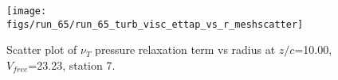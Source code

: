 \begin{figure}[H]
\centering
\texttt{[image: figs/run\_65/run\_65\_turb\_visc\_ettap\_vs\_r\_meshscatter]}
\caption{Scatter plot of $\nu_T$ pressure relaxation term vs radius at $z/c$=10.00, $V_{free}$=23.23, station 7.}
\label{fig:run_65_turb_visc_ettap_vs_r_meshscatter}
\end{figure}


